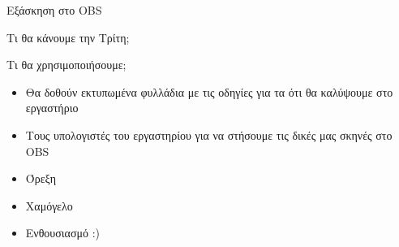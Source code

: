 \documentclass[aspectratio=169]{beamer}
\begin{document}
\begin{frame}[allowframebreaks]{Εξάσκηση στο OBS}
\begin{exampleblock}{Τι θα κάνουμε την Τρίτη;}
\begin{itemize}
    \end{itemize}
  \end{exampleblock}
  \begin{exampleblock}
    {Τι θα χρησιμοποιήσουμε;}
    \begin{itemize}
      \item Θα δοθούν εκτυπωμένα φυλλάδια με τις οδηγίες για τα ότι θα καλύψουμε στο εργαστήριο
      \item Τους υπολογιστές του εργαστηρίου για να στήσουμε τις δικές μας σκηνές στο OBS
      \item Όρεξη
      \item Χαμόγελο
      \item Ενθουσιασμό :)
    \end{itemize}
  \end{exampleblock}
\end{frame}
\end{document}
